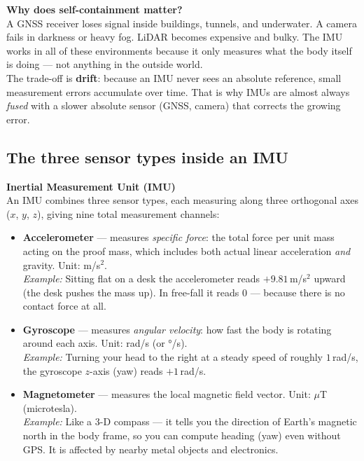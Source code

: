 \documentclass[12pt, a4paper]{article}
\begin{document}
\begin{notebox}
  \textbf{Why does self-containment matter?}\\
  A GNSS receiver loses signal inside buildings, tunnels, and underwater.
  A camera fails in darkness or heavy fog.
  LiDAR becomes expensive and bulky.
  The IMU works in all of these environments because it only measures
  what the body itself is doing --- not anything in the outside world.\\[4pt]
  The trade-off is \textbf{drift}: because an IMU never sees an absolute
  reference, small measurement errors accumulate over time.
  That is why IMUs are almost always \emph{fused} with a slower
  absolute sensor (GNSS, camera) that corrects the growing error.
\end{notebox}

\subsection*{The three sensor types inside an IMU}

\begin{defbox}
  \textbf{Inertial Measurement Unit (IMU)}\\
  An IMU combines three sensor types, each measuring along three
  orthogonal axes ($x$, $y$, $z$), giving nine total measurement
  channels:

  \begin{itemize}[leftmargin=1.4em, topsep=4pt]
    \item \textbf{Accelerometer} --- measures \emph{specific force}:
          the total force per unit mass acting on the proof mass,
          which includes both actual linear acceleration \emph{and}
          gravity. Unit: m/s$^2$.\\
          \textit{Example:} Sitting flat on a desk the accelerometer
          reads $+9.81$\,m/s$^2$ upward (the desk pushes the mass up).
          In free-fall it reads $0$ --- because there is no contact
          force at all.

    \item \textbf{Gyroscope} --- measures \emph{angular velocity}:
          how fast the body is rotating around each axis. Unit: rad/s
          (or °/s).\\
          \textit{Example:} Turning your head to the right at a steady
          speed of roughly $1$\,rad/s, the gyroscope $z$-axis
          (yaw) reads $+1$\,rad/s.

    \item \textbf{Magnetometer} --- measures the local magnetic field
          vector. Unit: $\mu$T (microtesla).\\
          \textit{Example:} Like a 3-D compass --- it tells you the
          direction of Earth's magnetic north in the body frame, so
          you can compute heading (yaw) even without GPS.
          It is affected by nearby metal objects and electronics.
  \end{itemize}
\end{defbox}
\end{document}
